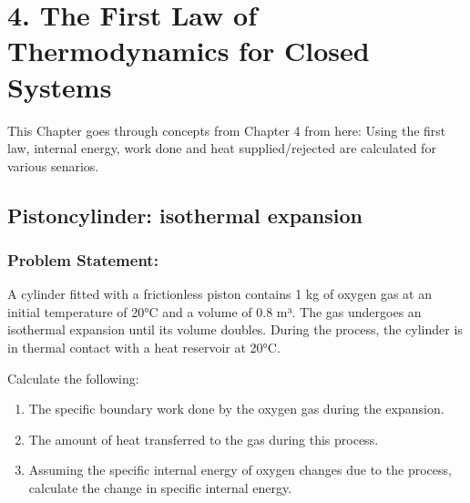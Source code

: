 \documentclass[letterpaper,10pt,english]{jupyterBook}
\begin{document}
\chapter{4. The First Law of Thermodynamics for Closed Systems}
\label{\detokenize{notebooks/Chapter4/first-law:the-first-law-of-thermodynamics-for-closed-systems}}\label{\detokenize{notebooks/Chapter4/first-law::doc}}
\sphinxAtStartPar
This Chapter goes through concepts from Chapter 4 from here: 
Using the first law, internal energy, work done and heat supplied/rejected are calculated for various senarios.

\sphinxstepscope


\section{Piston\sphinxhyphen{}cylinder: isothermal expansion}
\label{\detokenize{notebooks/Chapter4/Thermodynamics_Example_2:piston-cylinder-isothermal-expansion}}\label{\detokenize{notebooks/Chapter4/Thermodynamics_Example_2::doc}}

\subsection{Problem Statement:}
\label{\detokenize{notebooks/Chapter4/Thermodynamics_Example_2:problem-statement}}
\sphinxAtStartPar
A cylinder fitted with a frictionless piston contains 1 kg of oxygen gas at an initial temperature of 20°C
and a volume of 0.8 m³. The gas undergoes an isothermal expansion until its volume doubles.
During the process, the cylinder is in thermal contact with a heat reservoir at 20°C.

\sphinxAtStartPar
Calculate the following:
\begin{enumerate}
%
\item {} 
\sphinxAtStartPar
The specific boundary work done by the oxygen gas during the expansion.

\item {} 
\sphinxAtStartPar
The amount of heat transferred to the gas during this process.

\item {} 
\sphinxAtStartPar
Assuming the specific internal energy of oxygen changes due to the process, calculate the change in specific internal energy.

\end{enumerate}
\end{document}
